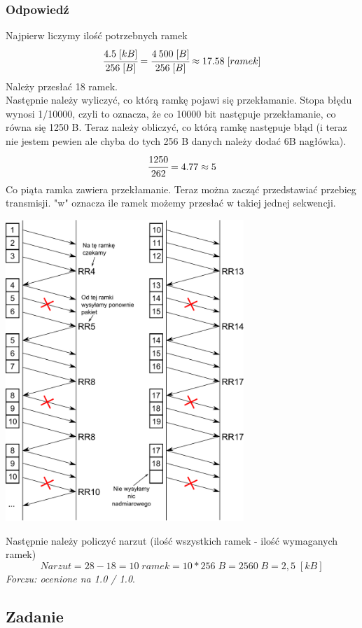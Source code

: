 		\subsubsection{Odpowiedź}
			Najpierw liczymy ilość potrzebnych ramek
			$$ \cfrac{4.5\;[kB]}{256\;[B]}=\cfrac{4\:500\;[B]}{256\;[B]}\approx17.58\;[ramek] $$Należy przesłać 18 ramek.\\
			Następnie należy wyliczyć, co którą ramkę pojawi się przekłamanie. Stopa błędu wynosi 1/10000, czyli to oznacza, że co 10000 bit następuje przekłamanie, co równa się 1250 B. Teraz należy obliczyć, co którą ramkę następuje błąd (i teraz nie jestem pewien ale chyba do tych 256 B danych należy dodać 6B nagłówka).
			$$ \cfrac{1250}{262}={4.77}\approx5 $$
			Co piąta ramka zawiera przekłamanie. Teraz można zacząć przedstawiać przebieg transmisji. "w" oznacza ile ramek możemy przesłać w takiej jednej sekwencji.
			\begin{center}
				\includegraphics[width=9.0cm]{./images/zadanie09.pdf}
			\end{center}
			Następnie należy policzyć narzut (ilość wszystkich ramek - ilość wymaganych ramek)\\
			$$ Narzut = 28 - 18  = 10\;ramek = 10 * 256\;B = 2560\;B =2,5\; [kB] $$
			\small{ \emph{Forczu: ocenione na 1.0 / 1.0}}.

\newpage
	\subsection{Zadanie}
